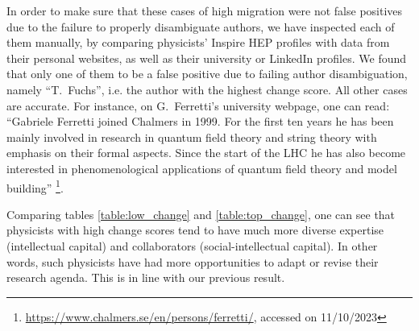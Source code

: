 \documentclass{article}
\begin{document}
In order to make sure that these cases of high migration were not false positives due to the failure to properly disambiguate authors, we have inspected each of them manually, by comparing physicists' Inspire HEP profiles with data from their personal websites, as well as their university or LinkedIn profiles. We found that only one of them to be a false positive due to failing author disambiguation, namely ``T.~Fuchs'', i.e. the author with the highest change score. All other cases are accurate.
For instance, on G.~Ferretti's university webpage, one can read: ``Gabriele Ferretti joined Chalmers in 1999. For the first ten years he has been mainly involved in research in quantum field theory and string theory with emphasis on their formal aspects. Since the start of the LHC he has also become interested in phenomenological applications of quantum field theory and model building'' \footnote{\url{https://www.chalmers.se/en/persons/ferretti/}, accessed on 11/10/2023}.

Comparing tables \ref{table:low_change} and \ref{table:top_change}, one can see that physicists with high change scores tend to have much more diverse expertise (intellectual capital) and collaborators (social-intellectual capital). In other words, such physicists have had more opportunities to adapt or revise their research agenda. This is in line with our previous result.
\end{document}
